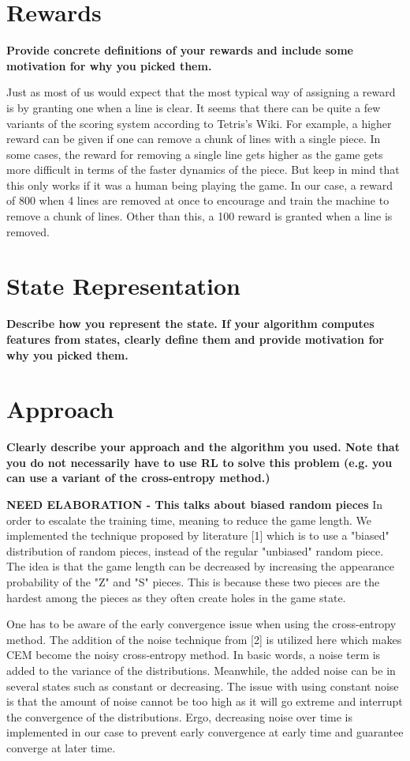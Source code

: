 \documentclass[12pt,letterpaper]{article}
\begin{document}
\section{Rewards}
\textbf{Provide concrete definitions of your rewards and include some motivation for why you picked them.}

Just as most of us would expect that the most typical way of assigning a reward is by granting one when a line is clear. It seems that there can be quite a few variants of the scoring system according to Tetris's Wiki. For example, a higher reward can be given if one can remove a chunk of lines with a single piece. In some cases, the reward for removing a single line gets higher as the game gets more difficult in terms of the faster dynamics of the piece. But keep in mind that this only works if it was a human being playing the game. In our case, a reward of 800 when 4 lines are removed at once to encourage and train the machine to remove a chunk of lines. Other than this, a 100 reward is granted when a line is removed.

\section{State Representation}
\textbf{Describe how you represent the state. If your algorithm computes features from states, clearly define them and provide motivation for why you picked them.} 

\section{Approach}
\textbf{Clearly describe your approach and the algorithm you used. Note that you do not necessarily have to use RL to solve this problem (e.g. you can use a variant of the cross-entropy method.)}

\textbf{NEED ELABORATION - This talks about biased random pieces}
In order to escalate the training time, meaning to reduce the game length. We implemented the technique proposed by literature [1] which is to use a "biased" distribution of random pieces, instead of the regular "unbiased" random piece. The idea is that the game length can be decreased by increasing the appearance probability of the "Z" and "S" pieces. This is because these two pieces are the hardest among the pieces as they often create holes in the game state. 

One has to be aware of the early convergence issue when using the cross-entropy method. The addition of the noise technique from [2] is utilized here which makes CEM become the noisy cross-entropy method. In basic words, a noise term is added to the variance of the distributions. Meanwhile, the added noise can be in several states such as constant or decreasing. The issue with using constant noise is that the amount of noise cannot be too high as it will go extreme and interrupt the convergence of the distributions. Ergo, decreasing noise over time is implemented in our case to prevent early convergence at early time and guarantee converge at later time.
\end{document}

